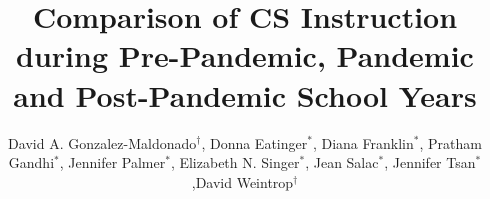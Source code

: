 \documentclass[sigconf,manuscript,review,anonymous]{acmart} %
\def\ts{TIPP\&SEE}
\def\umc{Use\begin{math}\rightarrow\end{math}Modify\begin{math}\rightarrow\end{math}Create\ }
\newcommand{\Scratchencore}[0]{Blinded Curriculum}
\begin{document}
\title[]{Comparison of CS Instruction during Pre-Pandemic, Pandemic and Post-Pandemic{} School Years}

\author{David A. Gonzalez-Maldonado$^\dagger$, Donna Eatinger$^\ast$, Diana Franklin$^\ast$, Pratham Gandhi$^\ast$, Jennifer Palmer$^\ast$, Elizabeth N. Singer$^\ast$, Jean Salac$^\ast$, Jennifer Tsan$^\ast$,David Weintrop$^\dagger$}


\begin{abstract}

\end{abstract}
\end{document}
